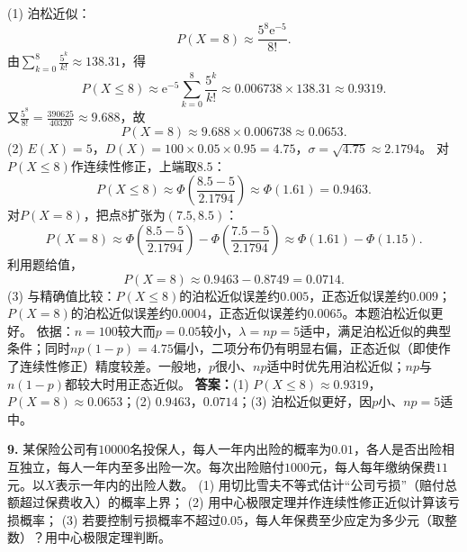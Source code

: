 \ifshowsolutions%
(1) 泊松近似：
\[
P(X=8)\approx\frac{5^8\mathrm{e}^{-5}}{8!}.
\]
由$\sum_{k=0}^{8}\frac{5^k}{k!}\approx138.31$，得
\[
P(X\leq8)\approx\mathrm{e}^{-5}\sum_{k=0}^{8}\frac{5^k}{k!}
\approx0.006738\times138.31\approx0.9319.
\]
又$\frac{5^8}{8!}=\frac{390625}{40320}\approx9.688$，故
\[
P(X=8)\approx9.688\times0.006738\approx0.0653.
\]
(2) $E(X)=5$，$D(X)=100\times0.05\times0.95=4.75$，$\sigma=\sqrt{4.75}\approx2.1794$。
对$P(X\leq8)$作连续性修正，上端取$8.5$：
\[
P(X\leq8)\approx\Phi\!\left(\frac{8.5-5}{2.1794}\right)\approx\Phi(1.61)=0.9463.
\]
对$P(X=8)$，把点$8$扩张为$(7.5,8.5)$：
\[
P(X=8)\approx\Phi\!\left(\frac{8.5-5}{2.1794}\right)-\Phi\!\left(\frac{7.5-5}{2.1794}\right)
\approx\Phi(1.61)-\Phi(1.15).
\]
利用题给值，
\[
P(X=8)\approx0.9463-0.8749=0.0714.
\]
(3) 与精确值比较：$P(X\leq8)$的泊松近似误差约$0.005$，正态近似误差约$0.009$；$P(X=8)$的泊松近似误差约$0.0004$，正态近似误差约$0.0065$。本题泊松近似更好。
依据：$n=100$较大而$p=0.05$较小，$\lambda=np=5$适中，满足泊松近似的典型条件；同时$np(1-p)=4.75$偏小，二项分布仍有明显右偏，正态近似（即使作了连续性修正）精度较差。一般地，$p$很小、$np$适中时优先用泊松近似；$np$与$n(1-p)$都较大时用正态近似。
\textbf{答案：}(1) $P(X\leq8)\approx0.9319$，$P(X=8)\approx0.0653$；(2) $0.9463$，$0.0714$；(3) 泊松近似更好，因$p$小、$np=5$适中。

\vspace{0.4cm}

\else \answerarea[10] \fi%
%
\textbf{9.} 某保险公司有$10000$名投保人，每人一年内出险的概率为$0.01$，各人是否出险相互独立，每人一年内至多出险一次。每次出险赔付$1000$元，每人每年缴纳保费$11$元。以$X$表示一年内的出险人数。
(1) 用切比雪夫不等式估计“公司亏损”（赔付总额超过保费收入）的概率上界；
(2) 用中心极限定理并作连续性修正近似计算该亏损概率；
(3) 若要控制亏损概率不超过$0.05$，每人年保费至少应定为多少元（取整数）？用中心极限定理判断。

